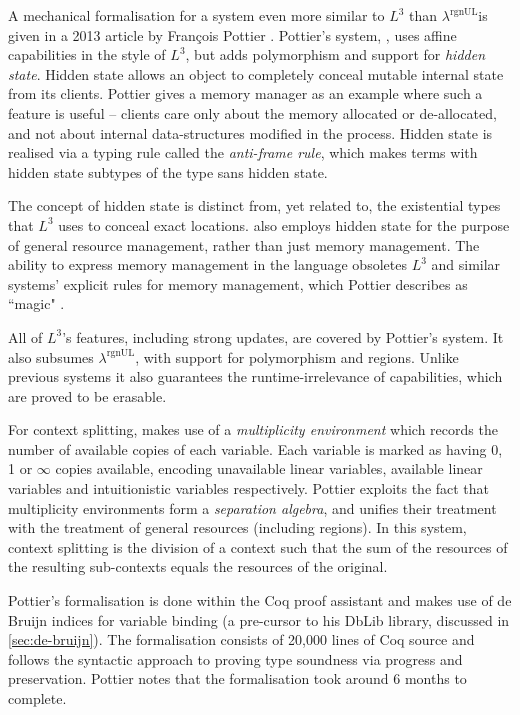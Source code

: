 \documentclass[]{unswthesis}
\newcommand{\rgnUL}{$\lambda^\text{rgnUL}$\text{ }}
\newcommand{\SSPHS}{\text{SSPHS }}
\newcommand{\Francois}{Fran\frenchc{c}ois }
\let\frenchc\c
\let\c\texttt
\let\i\textit
\begin{document}
A mechanical formalisation for a system even more similar to $L^3$ than \rgnUL is given in a 2013 article by \Francois Pottier \cite{pottier13}. Pottier's system, \SSPHS, uses affine capabilities in the style of $L^3$, but adds polymorphism and support for \i{hidden state}. Hidden state allows an object to completely conceal mutable internal state from its clients. Pottier gives a memory manager as an example where such a feature is useful -- clients care only about the memory allocated or de-allocated, and not about internal data-structures modified in the process. Hidden state is realised via a typing rule called the \i{anti-frame rule}, which makes terms with hidden state subtypes of the type sans hidden state.

The concept of hidden state is distinct from, yet related to, the existential types that $L^3$ uses to conceal exact locations. \SSPHS also employs hidden state for the purpose of general resource management, rather than just memory management. The ability to express memory management in the language obsoletes $L^3$ and similar systems' explicit rules for memory management, which Pottier describes as ``magic" \cite{pottier13}.

All of $L^3$'s features, including strong updates, are covered by Pottier's system. It also subsumes \rgnUL, with support for polymorphism and regions. Unlike previous systems it also guarantees the runtime-irrelevance of capabilities, which are proved to be erasable.

For context splitting, \SSPHS makes use of a \i{multiplicity environment} which records the number of available copies of each variable. Each variable is marked as having 0, 1 or $\infty$ copies available, encoding unavailable linear variables, available linear variables and intuitionistic variables respectively. Pottier exploits the fact that multiplicity environments form a \i{separation algebra}, and unifies their treatment with the treatment of general resources (including regions). In this system, context splitting is the division of a context such that the sum of the resources of the resulting sub-contexts equals the resources of the original.

Pottier's formalisation is done within the Coq proof assistant and makes use of de Bruijn indices for variable binding (a pre-cursor to his DbLib library, discussed in \cref{sec:de-bruijn}). The formalisation consists of 20,000 lines of Coq source and follows the syntactic approach to proving type soundness via progress and preservation. Pottier notes that the formalisation took around 6 months to complete.
\end{document}
